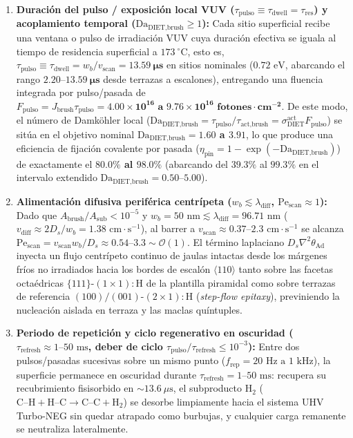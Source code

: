 \documentclass[10pt,twocolumn,a4paper]{article}
\begin{document}
\begin{enumerate}
    \item \textbf{Duración del pulso / exposición local VUV ($\tau_{\text{pulso}} \equiv \tau_{\text{dwell}} = \tau_{\text{res}}$) y acoplamiento temporal ($\text{Da}_{\text{DIET,brush}} \ge 1$):} Cada sitio superficial recibe una ventana o pulso de irradiación VUV cuya duración efectiva se iguala al tiempo de residencia superficial a $173\ ^\circ\text{C}$, esto es, $\tau_{\text{pulso}} \equiv \tau_{\text{dwell}} = w_b / v_{\text{scan}} = \mathbf{13.59\ \mu\text{s}}$ en sitios nominales ($0.72\text{ eV}$, abarcando el rango $\mathbf{2.20\text{--}13.59\ \mu\text{s}}$ desde terrazas a escalones), entregando una fluencia integrada por pulso/pasada de $F_{\text{pulso}} = J_{\text{brush}}\tau_{\text{pulso}} = \mathbf{4.00 \times 10^{16}\text{ a }9.76 \times 10^{16}\text{ fotones}\cdot\text{cm}^{-2}}$. De este modo, el número de Damköhler local ($\text{Da}_{\text{DIET,brush}} = \tau_{\text{pulso}}/\tau_{\text{act,brush}} = \sigma_{\text{DIET}}^{\text{act}} F_{\text{pulso}}$) se sitúa en el objetivo nominal \textbf{$\text{Da}_{\text{DIET,brush}} = 1.60$ a $3.91$}, lo que produce una eficiencia de fijación covalente por pasada ($\eta_{\text{pin}} = 1 - \exp(-\text{Da}_{\text{DIET,brush}})$) de exactamente el \textbf{$80.0\%$ al $98.0\%$} (abarcando del $39.3\%$ al $99.3\%$ en el intervalo extendido $\text{Da}_{\text{DIET,brush}} = 0.50\text{--}5.00$).
    \item \textbf{Alimentación difusiva periférica centrípeta ($w_b \lesssim \lambda_{\text{diff}}$, $\text{Pe}_{\text{scan}} \approx 1$):} Dado que $A_{\text{brush}}/A_{\text{sub}} < 10^{-5}$ y $w_b = 50\text{ nm} \lesssim \lambda_{\text{diff}} = 96.71\text{ nm}$ ($v_{\text{diff}} \approx 2 D_s / w_b = 1.38\text{ cm}\cdot\text{s}^{-1}$), al barrer a $v_{\text{scan}} \approx 0.37\text{--}2.3\text{ cm}\cdot\text{s}^{-1}$ se alcanza \textbf{$\text{Pe}_{\text{scan}} = v_{\text{scan}} w_b / D_s \approx 0.54\text{--}3.3 \sim \mathcal{O}(1)$}. El término laplaciano $D_s \nabla^2 \theta_{\text{Ad}}$ inyecta un flujo centrípeto continuo de jaulas intactas desde los márgenes fríos no irradiados hacia los bordes de escalón $\langle 110 \rangle$ tanto sobre las facetas octaédricas $\{111\}\text{-}(1\times 1):\text{H}$ de la plantilla piramidal como sobre terrazas de referencia $(100)/(001)\text{-}(2\times 1):\text{H}$ (\textit{step-flow epitaxy}), previniendo la nucleación aislada en terraza y las maclas quíntuples.
    \item \textbf{Periodo de repetición y ciclo regenerativo en oscuridad ($\tau_{\text{refresh}} \approx 1\text{--}50\text{ ms}$, deber de ciclo $\tau_{\text{pulso}}/\tau_{\text{refresh}} \le 10^{-3}$):} Entre dos pulsos/pasadas sucesivas sobre un mismo punto ($f_{\text{rep}} = 20\text{ Hz a }1\text{ kHz}$), la superficie permanece en oscuridad durante $\tau_{\text{refresh}} = 1\text{--}50\text{ ms}$: recupera su recubrimiento fisisorbido en $\sim 13.6\ \mu\text{s}$, el subproducto $\text{H}_2$ ($\text{C--H} + \text{H--C} \to \text{C--C} + \text{H}_2$) se desorbe limpiamente hacia el sistema UHV Turbo-NEG sin quedar atrapado como burbujas, y cualquier carga remanente se neutraliza lateralmente.
\end{enumerate}
\end{document}
